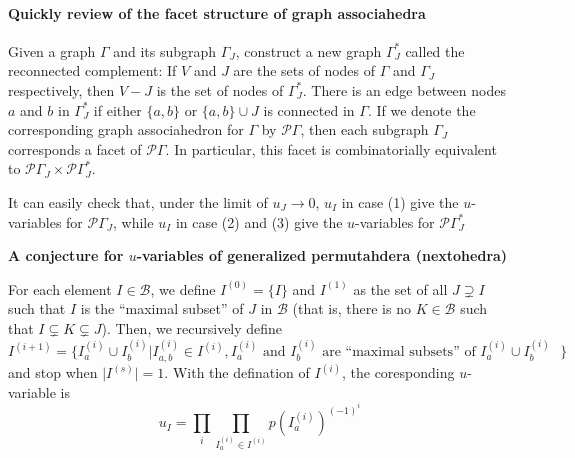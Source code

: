 \documentclass[hidelinks,12pt]{article}
\begin{document}
\paragraph{Quickly review of the facet structure of graph associahedra} Given a graph $\Gamma$ and its subgraph $\Gamma_{J}$, construct a new graph $\Gamma_{J}^{\ast}$ called the reconnected complement: If $V$ and $J$ are the sets of nodes of $\Gamma$ and $\Gamma_{J}$ respectively, then $V-J$ is the set of nodes of $\Gamma_{J}^{\ast}$. There is an edge between nodes $a$ and $b$ in $\Gamma_{J}^{\ast}$ if either $\{a, b\}$ or $\{a, b\}\cup J$ is connected in $\Gamma$. If we denote the corresponding graph associahedron for $\Gamma$ by $\mathcal{P}\Gamma$, then each subgraph $\Gamma_{J}$ corresponds a facet of $\mathcal{P}\Gamma$. In particular, this facet is combinatorially equivalent to $\mathcal{P}\Gamma_{J}\times \mathcal{P}\Gamma_{J}^{\ast}$\cite{}.

It can easily check that, under the limit of $u_{J}\to 0$, $u_{I}$ in case (1) give the $u$-variables for $\mathcal{P}\Gamma_{J}$, while  $u_{I}$ in case (2) and (3) give the $u$-variables for $\mathcal{P}\Gamma_{J}^{\ast}$

{\bf A conjecture for $u$-variables of generalized permutahdera (nextohedra)}

For each element $ I\in \mathcal B$, we define $I^{(0)}=\{I\}$ and  $I^{(1)}$ as the set of all $J\supsetneq I $ such that  $I$ is the ``maximal subset'' of $J$ in $\mathcal{B}$ (that is, there is no $K\in \mathcal{B}$ such that $I\subsetneq K\subsetneq J $). Then, we recursively define 
\begin{equation}
   I^{(i+1)} = \{I^{(i)}_{a}\cup I^{(i)}_{b}\vert I_{a,b}^{(i)}\in I^{(i)},\text{$I_{a}^{(i)}$ and $I_{b}^{(i)}$ are ``maximal subsets'' of $I^{(i)}_{a}\cup I^{(i)}_{b}$ }\}
\end{equation} 
and stop when $\lvert I^{(s)}\rvert =1$. With the defination of $I^{(i)}$, the coresponding $u$-variable is
\begin{equation}
   u_{I} =\prod_{i}\prod_{I_{a}^{(i)}\in I^{(i)}} p(I_{a}^{(i)})^{(-1)^{i} }
\end{equation}


\end{document}
